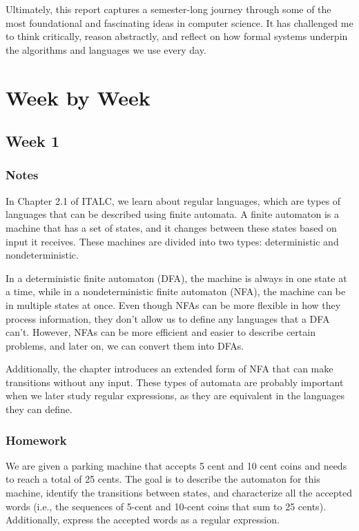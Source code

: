 \documentclass{article}
\theoremstyle{theorem}
\theoremstyle{definition}
\theoremstyle{remark}
\begin{document}
Ultimately, this report captures a semester-long journey through some of the most foundational and fascinating ideas in computer science. It has challenged me to think critically, reason abstractly, and reflect on how formal systems underpin the algorithms and languages we use every day.

\section{Week by Week}\label{homework}

\subsection{Week 1}


\subsubsection{Notes}

In Chapter 2.1 of ITALC, we learn about regular languages, which are types of languages that can be described using finite automata. A finite automaton is a machine that has a set of states, and it changes between these states based on input it receives. These machines are divided into two types: deterministic and nondeterministic.

In a deterministic finite automaton (DFA), the machine is always in one state at a time, while in a nondeterministic finite automaton (NFA), the machine can be in multiple states at once. Even though NFAs can be more flexible in how they process information, they don’t allow us to define any languages that a DFA can’t. However, NFAs can be more efficient and easier to describe certain problems, and later on, we can convert them into DFAs.

Additionally, the chapter introduces an extended form of NFA that can make transitions without any input. These types of automata are probably important when we later study regular expressions, as they are equivalent in the languages they can define.


\subsubsection{Homework}

We are given a parking machine that accepts 5 cent and 10 cent coins and needs to reach a total of 25 cents. The goal is to describe the automaton for this machine, identify the transitions between states, and characterize all the accepted words (i.e., the sequences of 5-cent and 10-cent coins that sum to 25 cents). Additionally, express the accepted words as a regular expression.
\end{document}
